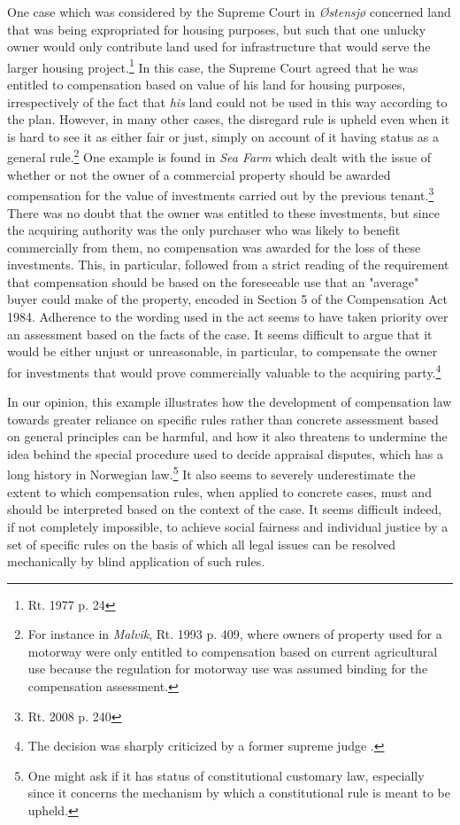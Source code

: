 One case which was considered by the Supreme Court in \emph{Østensjø} concerned land that was being expropriated for housing purposes, but such that one unlucky owner would only contribute land used for infrastructure that would serve the larger housing project.\footnote{Rt. 1977 p. 24} In this case, the Supreme Court agreed that he was entitled to compensation based on value of his land for housing purposes, irrespectively of the fact that \emph{his} land could not be used in this way according to the plan. However, in many other cases, the disregard rule is upheld even when it is hard to see it as either fair or just, simply on account of it having status as a general rule.\footnote{For instance in \emph{Malvik}, Rt. 1993 p. 409, where owners of property used for a motorway were only entitled to compensation based on current agricultural use because the regulation for motorway use was assumed binding for the compensation assessment.} One example is found in \emph{Sea Farm} which dealt with the issue of whether or not the owner of a commercial property should be awarded compensation for the value of investments carried out by the previous tenant.\footnote{Rt. 2008 p. 240} There was no doubt that the owner was entitled to these investments, but since the acquiring authority was the only purchaser who was likely to benefit commercially from them, no compensation was awarded for the loss of these investments. This, in particular, followed from a strict reading of the requirement that compensation should be based on the foreseeable use that an "average" buyer could make of the property, encoded in Section 5 of the Compensation Act 1984. Adherence to the wording used in the act seems to have taken priority over an assessment based on the facts of the case. It seems difficult to argue that it would be either unjust or unreasonable, in particular, to compensate the owner for investments that would prove commercially valuable to the acquiring party.\footnote{The decision was sharply criticized by a former supreme judge \cite{skog}.}

In our opinion, this example illustrates how the development of compensation law towards greater reliance on specific rules rather than concrete assessment based on general principles can be harmful, and how it also threatens to undermine the idea behind the special procedure used to decide appraisal disputes, which has a long history in Norwegian law.\footnote{One might ask if it has status of constitutional customary law, especially since it concerns the mechanism by which a constitutional rule is meant to be upheld.} It also seems to severely underestimate the extent to which compensation rules, when applied to concrete cases, must and should be interpreted based on the context of the case. It seems difficult indeed, if not completely impossible, to achieve social fairness and individual justice by a set of specific rules on the basis of which all legal issues can be resolved mechanically by blind application of such rules. %

